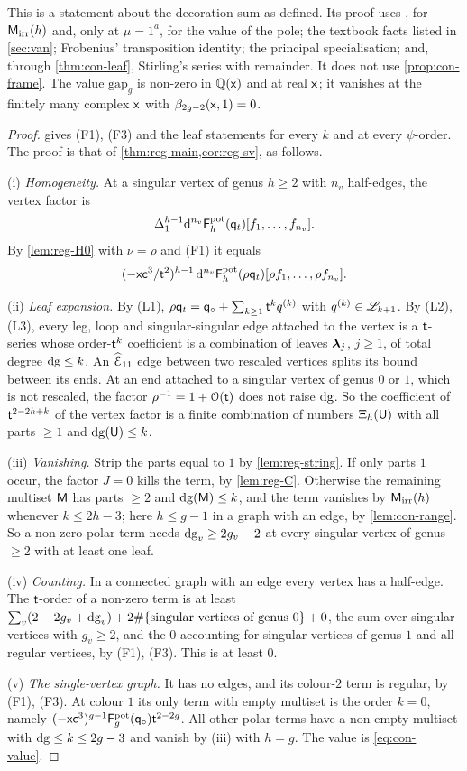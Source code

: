 This is a statement about the decoration sum as defined. Its proof uses \cite[eq.~(1)]{LLZ03}, for $\mathsf{M}_{\mathrm{irr}}(h)$ and, only at $\mu=1^a$, for the value of the pole; the textbook facts listed in \cref{sec:van}; Frobenius' transposition identity; the principal specialisation; and, through \cref{thm:con-leaf}, Stirling's series with remainder. It does not use \cref{prop:con-frame}. The value $\mathrm{gap}_g$ is non-zero in $\mathbb{Q}(\mathsf{x})$ and at real $\mathsf{x}$; it vanishes at the finitely many complex $\mathsf{x}$ with $\beta_{2g-2}(\mathsf{x},1)=0$.

\begin{proof}
 gives (F1), (F3) and the leaf statements for every $k$ and at every $\psi$-order. The proof is that of \cref{thm:reg-main,cor:reg-sv}, as follows.

(i) \emph{Homogeneity.} At a singular vertex of genus $h\geq 2$ with $n_{v}$ half-edges, the vertex factor is
\[
\Delta_1^{h-1}\mathrm{d}^{n_v}\mathsf{F}^{\mathrm{pot}}_h(\mathsf{q}_{t})[f_1,\dots,f_{n_{v}}].
\]
By \cref{lem:reg-H0} with $\nu=\rho$ and (F1) it equals
\[
(-\mathsf{x}\mathsf{c}^3/\mathsf{t}^2)^{h-1}\,\mathrm{d}^{n_v}\mathsf{F}^{\mathrm{pot}}_h(\rho\mathsf{q}_{t})[\rho f_1,\dots,\rho f_{n_{v}}].
\]

(ii) \emph{Leaf expansion.} By (L1), $\rho\mathsf{q}_{t}=\mathsf{q}_{\circ}+\sum_{k\geq 1}\mathsf{t}^kq^{(k)}$ with $q^{(k)}\in\mathscr{L}_{k+1}$. By (L2), (L3), every leg, loop and singular-singular edge attached to the vertex is a $\mathsf{t}$-series whose order-$\mathsf{t}^k$ coefficient is a combination of leaves $\boldsymbol{\lambda}_j$, $j\geq 1$, of total degree $\mathrm{dg}\leq k$. An $\widehat{\mathcal{E}}_{11}$ edge between two rescaled vertices splits its bound between its ends. At an end attached to a singular vertex of genus $0$ or $1$, which is not rescaled, the factor $\rho^{-1}=1+\mathcal{O}(\mathsf{t})$ does not raise $\mathrm{dg}$. So the coefficient of $\mathsf{t}^{2-2h+k}$ of the vertex factor is a finite combination of numbers $\Xi_h(\mathsf{U})$ with all parts $\geq 1$ and $\mathrm{dg}(\mathsf{U})\leq k$.

(iii) \emph{Vanishing.} Strip the parts equal to $1$ by \cref{lem:reg-string}. If only parts $1$ occur, the factor $J=0$ kills the term, by \cref{lem:reg-C}. Otherwise the remaining multiset $\mathsf{M}$ has parts $\geq 2$ and $\mathrm{dg}(\mathsf{M})\leq k$, and the term vanishes by $\mathsf{M}_{\mathrm{irr}}(h)$ whenever $k\leq 2h-3$; here $h\leq g-1$ in a graph with an edge, by \cref{lem:con-range}. So a non-zero polar term needs $\mathrm{dg}_{v}\geq 2g_{v}-2$ at every singular vertex of genus $\geq 2$ with at least one leaf.

(iv) \emph{Counting.} In a connected graph with an edge every vertex has a half-edge. The $\mathsf{t}$-order of a non-zero term is at least $\sum_{v}(2-2g_{v}+\mathrm{dg}_{v})+2\#\{\text{singular vertices of genus }0\}+0$, the sum over singular vertices with $g_{v}\geq 2$, and the $0$ accounting for singular vertices of genus $1$ and all regular vertices, by (F1), (F3). This is at least $0$.

(v) \emph{The single-vertex graph.} It has no edges, and its colour-$2$ term is regular, by (F1), (F3). At colour $1$ its only term with empty multiset is the order $k=0$, namely $(-\mathsf{x}\mathsf{c}^3)^{g-1}\mathsf{F}^{\mathrm{pot}}_g(\mathsf{q}_{\circ})\mathsf{t}^{2-2g}$. All other polar terms have a non-empty multiset with $\mathrm{dg}\leq k\leq 2g-3$ and vanish by (iii) with $h=g$. The value is \cref{eq:con-value}.
\end{proof}

